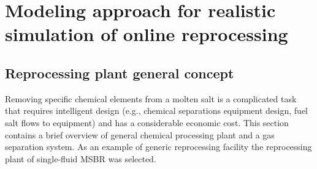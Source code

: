 \chapter[Modeling approach for realistic simulation of online reprocessing]{Modeling approach for realistic simulation of online reprocessing}

\section{Reprocessing plant general concept}
Removing specific chemical elements from a molten salt is a complicated 
task that requires intelligent design (e.g., chemical separations 
equipment design, fuel salt flows to equipment) and has a considerable 
economic cost. This section contains a brief overview of general 
chemical processing plant and a gas separation system. As an example 
of generic reprocessing facility the reprocessing plant of single-fluid 
\gls{MSBR} was selected.

